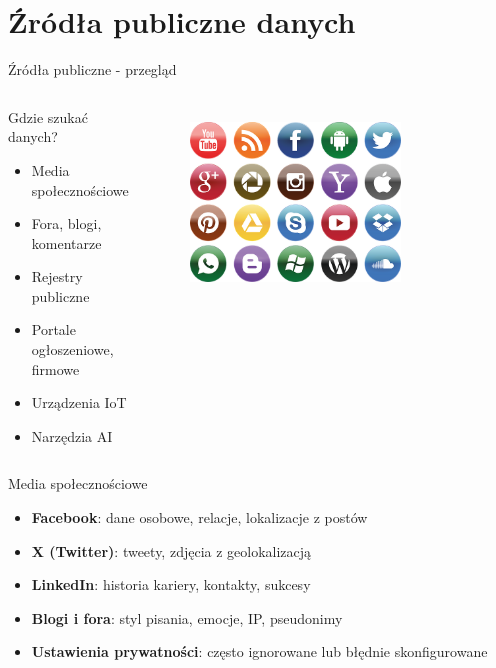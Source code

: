 \section{Źródła publiczne danych}

\begin{frame}{Źródła publiczne - przegląd}
\begin{columns}[c]
    \begin{alertblock}{Gdzie szukać danych?}
        \begin{itemize}
          \item Media społecznościowe
          \item Fora, blogi, komentarze
          \item Rejestry publiczne
          \item Portale ogłoszeniowe, firmowe
          \item Urządzenia IoT
          \item Narzędzia AI
        \end{itemize}
        \end{alertblock}
    \centering
    \begin{figure}
        \centering
        \includegraphics[width=0.75\textwidth]{images/socialMedia.png}
        \label{fig:socialMedia}
    \end{figure}    
\end{columns}
\end{frame}

\begin{frame}{Media społecznościowe}
\begin{block}{}
\begin{itemize}
  \item \textbf{Facebook}: dane osobowe, relacje, lokalizacje z postów
  \item \textbf{X (Twitter)}: tweety, zdjęcia z geolokalizacją
  \item \textbf{LinkedIn}: historia kariery, kontakty, sukcesy
  \item \textbf{Blogi i fora}: styl pisania, emocje, IP, pseudonimy
  \item \textbf{Ustawienia prywatności}: często ignorowane lub błędnie skonfigurowane \cite{zrodlo} \cite{zrodloArtykul}
\end{itemize}
\end{block}
\end{frame}

